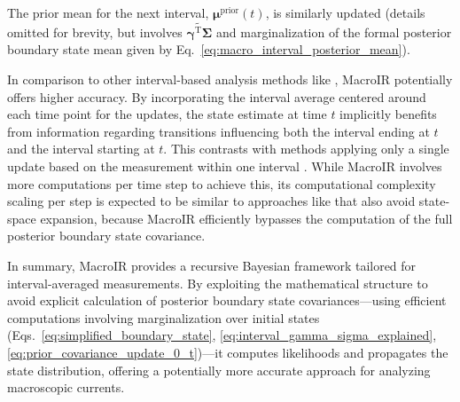 \documentclass[9pt]{elife}
\begin{document}
	The prior mean for the next interval, \( \boldsymbol{\mu}^{\text{prior}}(t) \), is similarly updated (details omitted for brevity, but involves \( \widetilde{\boldsymbol{\gamma}^{\mathrm{T}} \boldsymbol{\Sigma}} \) and marginalization of the formal posterior boundary state mean given by Eq.~\ref{eq:macro_interval_posterior_mean}). 
	
	In comparison to other interval-based analysis methods like \cite{Munch2022}, MacroIR potentially offers higher accuracy. By incorporating the interval average centered around each time point for the updates, the state estimate at time \(t\) implicitly benefits from information regarding transitions influencing both the interval ending at \(t\) and the interval starting at \(t\). This contrasts with methods applying only a single update based on the measurement within one interval \cite{Munch2022}. While MacroIR involves more computations per time step to achieve this, its computational complexity scaling per step is expected to be similar to approaches like \cite{Munch2022} that also avoid state-space expansion, because MacroIR efficiently bypasses the computation of the full posterior boundary state covariance.
	
	In summary, MacroIR provides a recursive Bayesian framework tailored for interval-averaged measurements. By exploiting the mathematical structure to avoid explicit calculation of posterior boundary state covariances—using efficient computations involving marginalization over initial states (Eqs.~\ref{eq:simplified_boundary_state}, \ref{eq:interval_gamma_sigma_explained}, \ref{eq:prior_covariance_update_0_t})—it computes likelihoods and propagates the state distribution, offering a potentially more accurate approach for analyzing macroscopic currents.
	
	
\end{document}
